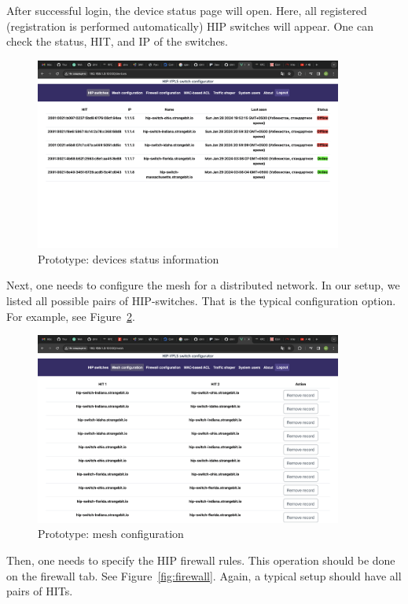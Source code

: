After successful login, the device status page will open. Here, 
all registered (registration is performed automatically) HIP 
switches will appear. One can check the status, HIT, and IP of the 
switches.

\begin{figure}[ht!]
\centering
\includegraphics[width=0.9\textwidth]{graphics/devices.png}
\caption{Prototype: devices status information}
\label{fig:devices}
\end{figure}
\clearpage

Next, one needs to configure the mesh for a distributed network. 
In our setup, we listed all possible pairs of HIP-switches. That 
is the typical configuration option. For example, see Figure~\ref{fig:mesh}.

\begin{figure}[h!]
\centering
\includegraphics[width=0.9\textwidth]{graphics/mesh.png}
\caption{Prototype: mesh configuration}
\label{fig:mesh}
\end{figure}
\clearpage

Then, one needs to specify the HIP firewall rules. This operation 
should be done on the firewall tab. See Figure~\ref{fig:firewall}. 
Again, a typical setup should have all pairs of HITs.

